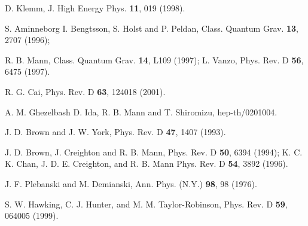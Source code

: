 \documentclass[a4paper,12pt,onecolumn]{revtex4}
\begin{document}
\begin{thebibliography}{99}
  D. Klemm, J. High Energy Phys. \textbf{11}, 019 (1998).

  S. Aminneborg I. Bengtsson, S. Holst and P. Peldan, Class.
Quantum Grav. \textbf{13}, 2707 (1996);

  R. B. Mann, Class. Quantum Grav. \textbf{14}, L109 (1997); L.
Vanzo, Phys. Rev. D \textbf{56}, 6475 (1997).

  R. G. Cai, Phys. Rev. D \textbf{63}, 124018 (2001).

  A. M. Ghezelbash D. Ida, R. B. Mann and T. Shiromizu,
hep-th/0201004.

  J. D. Brown and J. W. York, Phys. Rev. D \textbf{47}, 1407
(1993).

  J. D. Brown, J. Creighton and R. B. Mann, Phys. Rev. D
\textbf{50}, 6394 (1994); K. C. K. Chan, J. D. E. Creighton, and R. B. Mann
Phys. Rev. D \textbf{54}, 3892 (1996).

  J. F. Plebanski and M. Demianski, Ann. Phys. (N.Y.)
\textbf{98}, 98 (1976).

  S. W. Hawking, C. J. Hunter, and M. M. Taylor-Robinson, Phys.
Rev. D \textbf{59}, 064005 (1999).
\end{thebibliography}
\end{document}
